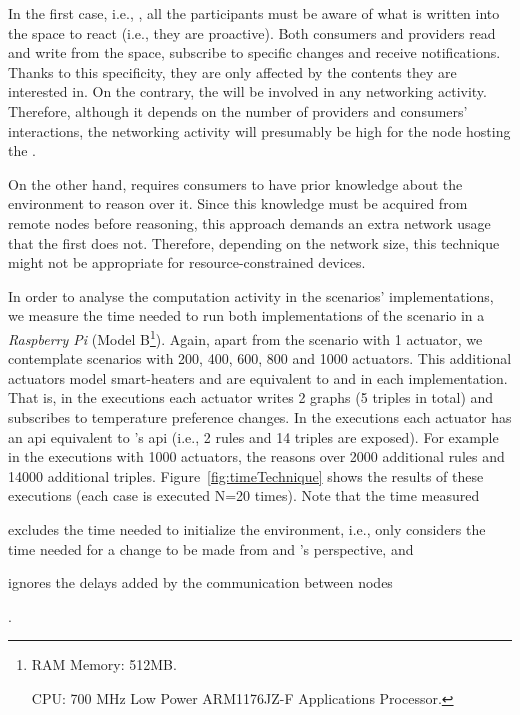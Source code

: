 In the first case, i.e., \spaceActuation{}, all the participants must be aware of what is written into the space to react (i.e., they are proactive).
Both consumers and providers read and write from the space, subscribe to specific changes and receive notifications.
Thanks to this specificity, they are only affected by the contents they are interested in. %
On the contrary, the \Space{} will be involved in any networking activity.
Therefore, although it depends on the number of providers and consumers' interactions, the networking activity will presumably be high for the node hosting the \Space{}.


On the other hand, \restActuation{} requires consumers to have prior knowledge about the environment to reason over it. %
Since this knowledge must be acquired from remote nodes before reasoning, this approach demands an extra network usage that the first does not.
Therefore, depending on the network size, this technique might not be appropriate for resource-constrained devices.


\bigskip


In order to analyse the computation activity in the scenarios' implementations, we measure the time needed to run both implementations of the scenario in a \emph{Raspberry Pi} (Model B\footnote{
RAM Memory: 512MB.

CPU: 700 MHz Low Power ARM1176JZ-F Applications Processor.
}).
Again, apart from the scenario with 1 actuator, we contemplate scenarios with 200, 400, 600, 800 and 1000 actuators.
This additional actuators model smart-heaters and are equivalent to \nodeProvSpace{} and \nodeProvRest{} in each implementation.
That is, in the \spaceActuation{} executions each actuator writes 2 graphs (5 triples in total) and subscribes to temperature preference changes.
In the \restActuation{} executions each actuator has an \ac{api} equivalent to \nodeProvRest{}'s \ac{api} (i.e., 2 rules and 14 triples are exposed).
For example in the \nodeProvRest{} executions with 1000 actuators, the \nodeConsRest{} reasons over 2000 additional rules and 14000 additional triples.
Figure~\ref{fig:timeTechnique} shows the results of these executions (each case is executed N=20 times).
Note that the time measured 
\begin{enumerate*}[label=\itshape\bfseries(\arabic*\upshape)]
  \item excludes the time needed to initialize the environment, i.e., only considers the time needed for a change to be made from \nodeConsSpace{} and \nodeConsRest{}'s  perspective, and
  \item ignores the delays added by the communication between nodes %
\end{enumerate*}.


